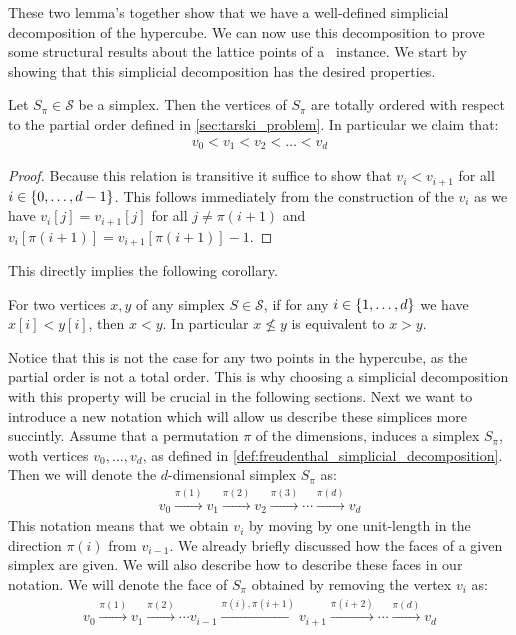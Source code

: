 These two lemma's together show that we have a well-defined simplicial decomposition of the hypercube. We can now use this decomposition to prove some structural results about the lattice points of a \Tarski\ instance. We start by showing that this simplicial decomposition has the desired properties.
\begin{lemma}
    Let $S_{\pi} \in \mathcal{S}$ be a simplex. Then the vertices of $S_{\pi}$ are totally ordered with respect to the partial order defined in \cref{sec:tarski_problem}. In particular we claim that:
    \begin{align*}
        v_0 < v_1 < v_2 < \dots < v_d
    \end{align*}
\end{lemma}
\begin{proof}
    Because this relation is transitive it suffice to show that $v_i < v_{i+1}$ for all $i \in \left\{0, \dots, d-1\right\}$. This follows immediately from the construction of the $v_i$ as we have $v_i[j] = v_{i+1}[j]$ for all $j \neq \pi(i+1)$ and $v_i[\pi(i+1)] = v_{i+1}[\pi(i+1)] - 1$.
\end{proof}
This directly implies the following corollary.
\begin{corollary}
    \label{cor:total_ordering}
    For two vertices $x,y$ of any simplex $S \in \mathcal{S}$, if for any $i \in \left\{1, \dots, d\right\}$ we have $x[i] < y[i]$, then $x < y$. In particular $x \not\leq y$ is equivalent to $x > y$.
\end{corollary}
Notice that this is not the case for any two points in the hypercube, as the partial order is not a total order. This is why choosing a simplicial decomposition with this property will be crucial in the following sections. Next we want to introduce a new notation which will allow us describe these simplices more succintly. Assume that a permutation $\pi$ of the dimensions, induces a simplex $S_{\pi}$, woth vertices $v_0, \dots, v_d$, as defined in \cref{def:freudenthal_simplicial_decomposition}. Then we will denote the $d$-dimensional simplex $S_{\pi}$ as:
\begin{align*}
    v_0 \xrightarrow{\pi(1)} v_1 \xrightarrow{\pi(2)} v_2 \xrightarrow{\pi(3)} \cdots \xrightarrow{\pi(d)} v_d
\end{align*}
This notation means that we obtain $v_i$ by moving by one unit-length in the direction $\pi(i)$ from $v_{i-1}$. We already briefly discussed how the faces of a given simplex are given. We will also describe how to describe these faces in our notation. We will denote the face of $S_{\pi}$ obtained by removing the vertex $v_i$ as:
\begin{align*}
    v_0 \xrightarrow{\pi(1)} v_1 \xrightarrow{\pi(2)} \cdots v_{i-1} \xrightarrow{\pi(i), \pi(i+1)} v_{i+1} \xrightarrow{\pi(i+2)} \cdots \xrightarrow{\pi(d)} v_d
\end{align*}

